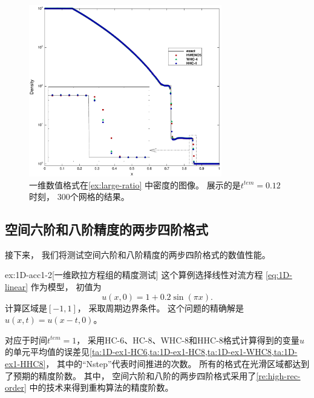 \begin{figure}[htbp]
  \centering
  \includegraphics[width=0.75\textwidth]{fig/1D/Ex6.pdf}
  \caption{一维数值格式在\cref{ex:large-ratio} 中密度的图像。
    展示的是$t^{tem} = 0.12$时刻，
    $300$个网格的结果。
  }
  \label{fig:6_1}
\end{figure}

\subsection{空间六阶和八阶精度的两步四阶格式}

接下来，
我们将测试空间六阶和八阶精度的两步四阶格式的数值性能。

\begin{exampleRe}{ex:1D-acc1}{-2}[一维欧拉方程组的精度测试]
  \label{ex:1D-acc1-re}
  这个算例选择线性对流方程 \cref{eq:1D-linear} 作为模型，
  初值为
  \begin{equation}
    u(x, 0) = 1 + 0.2\sin(\pi x).
  \end{equation}
  计算区域是$[-1,1]$，
  采取周期边界条件。
  这个问题的精确解是$u(x,t) = u(x-t,0)$。
\end{exampleRe}

对应于时间$t^{tem}=1$，
采用HC-6、HC-8、WHC-8和HHC-8格式计算得到的变量$u$的单元平均值的误差见\cref{ta:1D-ex1-HC6,ta:1D-ex1-HC8,ta:1D-ex1-WHC8,ta:1D-ex1-HHC8}，
其中的“Nstep”代表时间推进的次数。
所有的格式在光滑区域都达到了预期的精度阶数。
其中，
空间六阶和八阶的两步四阶格式采用了\cref{re:high-rec-order} 中的技术来得到重构算法的精度阶数。

